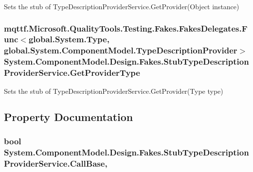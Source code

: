 Sets the stub of Type\-Description\-Provider\-Service.\-Get\-Provider(\-Object instance)

\hypertarget{class_system_1_1_component_model_1_1_design_1_1_fakes_1_1_stub_type_description_provider_service_a789f1bd753e85e7d0eee85a167720cae}{
\subsubsection[{Get\-Provider\-Type}]{\setlength{\rightskip}{0pt plus 5cm}mqttf.\-Microsoft.\-Quality\-Tools.\-Testing.\-Fakes.\-Fakes\-Delegates.\-Func$<$global.\-System.\-Type, global.\-System.\-Component\-Model.\-Type\-Description\-Provider$>$ System.\-Component\-Model.\-Design.\-Fakes.\-Stub\-Type\-Description\-Provider\-Service.\-Get\-Provider\-Type}}\label{class_system_1_1_component_model_1_1_design_1_1_fakes_1_1_stub_type_description_provider_service_a789f1bd753e85e7d0eee85a167720cae}


Sets the stub of Type\-Description\-Provider\-Service.\-Get\-Provider(\-Type type)



\subsection{Property Documentation}
\hypertarget{class_system_1_1_component_model_1_1_design_1_1_fakes_1_1_stub_type_description_provider_service_a2836efffd64b45f245c0687d59eabb90}{
\subsubsection[{Call\-Base}]{\setlength{\rightskip}{0pt plus 5cm}bool System.\-Component\-Model.\-Design.\-Fakes.\-Stub\-Type\-Description\-Provider\-Service.\-Call\-Base\hspace{0.3cm}{\ttfamily [get]}, {\ttfamily [set]}}}\label{class_system_1_1_component_model_1_1_design_1_1_fakes_1_1_stub_type_description_provider_service_a2836efffd64b45f245c0687d59eabb90}


